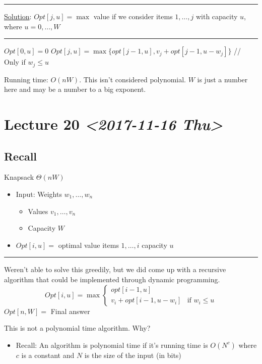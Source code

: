 \documentclass[11pt]{article}
\begin{document}
\noindent\rule{\textwidth}{0.5pt}
\uline{Solution}:
\(Opt[j,u]=\max\) value if we consider items \(1,\ldots,j\) with capacity \(u\), where \(u=0, \ldots, W\)

\noindent\rule{\textwidth}{0.5pt}
\begin{algorithmic}
	\State $Opt[0,u]=0$
\EndFor
{}
	   \State $Opt[j,u] = \max \{opt[j-1,u], v_j+opt[j-1,u-w_j]\}$
	   \State // Only if $w_j \leq u$
\EndFor
\end{algorithmic}
Running time: \(O(nW)\). This isn't considered polynomial. \(W\) is just a number here and may be a number to a big exponent.
\section{Lecture 20 \textit{<2017-11-16 Thu>}}
\label{sec:org3ab5edf}
\subsection{Recall}
\label{sec:org33d1795}
Knapsack \(\Theta(nW)\)
\begin{itemize}
\item Input: Weights \(w_1,\ldots,w_n\)
\begin{itemize}
\item Values \(v_1,\ldots,v_n\)
\item Capacity \(W\)
\end{itemize}
\item \(Opt[i,u]=\) optimal value items \(1,\ldots,i\) capacity \(u\)
\end{itemize}

\noindent\rule{\textwidth}{0.5pt}
Weren't able to solve this greedily, but we did come up with a recursive algorithm that could be implemented through dynamic programming.
\begin{equation*}
Opt[i,u] = \max 
\begin{cases}
opt[i-1, u]
\\ v_i + opt[i-1, u-w_i] & \text{if } w_i\leq u 
\end{cases}
\end{equation*}
\(Opt[n,W]=\) Final answer

This is not a polynomial time algorithm. Why?
\begin{itemize}
\item Recall: An algorithm is polynomial time if it's running time is \(O(N^c)\) where \(c\) is a constant and \(N\) is the size of the input (in bits)
\end{itemize}
\end{document}
